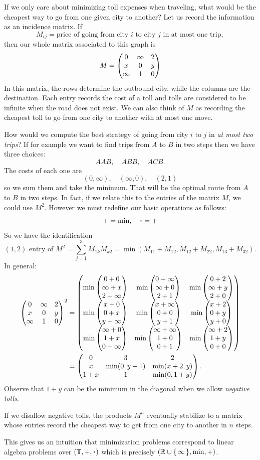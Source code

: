 \documentclass[12pt]{memoir}
\begin{document}
If we only care about minimizing toll expenses when traveling, what would be the cheapest way to go from one given city to another? Let us record the information as an incidence matrix. If 
$$M_{ij}=\text{price of going from city }i\text{ to city }j\text{ in at most one trip},$$
then our whole matrix associated to this graph is 
$$M=\begin{pmatrix} 0 & \infty & 2 \\ x & 0 & y \\ \infty & 1 & 0 \end{pmatrix}$$
In this matrix, the rows determine the outbound city, while the columns are the destination. Each entry records the cost of a toll and tolls are considered to be infinite when the road does not exist. We can also think of $M$ as recording the cheapest toll to go from one city to another with at most one move.\par 
How would we compute the best strategy of going from city $i$ to $j$ in \emph{at most two trips}? If for example we want to find trips from $A$ to $B$ in two steps then we have three choices:
$$AAB,\quad ABB,\quad ACB.$$
The costs of each one are 
$$(0,\infty),\quad (\infty,0),\quad (2,1)$$
so we sum them and take the minimum. That will be the optimal route from $A$ to $B$ in two steps. In fact, if we relate this to the entries of the matrix $M$, we could use $M^2$. However we must redefine our basic operations as follows: 
$$+=\min,\quad\.=+$$
So we have the identification 
$$(1,2)\text{ entry of }M^2=\sum_{j=1}^{3}M_{1k}M_{k2}=\min(M_{11}+M_{12},M_{12}+M_{22},M_{13}+M_{32}).$$
In general:
\begin{align*}
    \begin{pmatrix} 0 & \infty & 2 \\ x & 0 & y \\ \infty & 1 & 0 \end{pmatrix}^2&=\begin{pmatrix} \min\begin{pmatrix} 0+0 \\ \infty+x \\ 2+\infty \end{pmatrix} & \min\begin{pmatrix} 0+\infty \\ \infty+0 \\ 2+1 \end{pmatrix} & \min\begin{pmatrix} 0+2 \\ \infty+y \\ 2+0 \end{pmatrix} \\ \min\begin{pmatrix} x+0 \\ 0+x \\ y+\infty \end{pmatrix} & \min\begin{pmatrix} x+\infty \\ 0+0 \\ y+1 \end{pmatrix} & \min\begin{pmatrix} x+2 \\ 0+y \\ y+0 \end{pmatrix} \\ \min\begin{pmatrix} \infty+0 \\ 1+x \\ 0+\infty \end{pmatrix} & \min\begin{pmatrix} \infty+\infty \\ 1+0 \\ 0+1 \end{pmatrix} & \min\begin{pmatrix} \infty+2 \\ 1+y \\ 0+0 \end{pmatrix} \end{pmatrix}\\
    &=\begin{pmatrix} 0 & 3 & 2 \\ x & \min(0,y+1) & \min(x+2,y) \\ 1+x & 1 & \min(0,1+y) \end{pmatrix}.
\end{align*}
Observe that $1+y$ can be the minimum in the diagonal when we allow \emph{negative tolls}.
\begin{Rmk}
If we disallow negative tolls, the products $M^n$ eventually stabilize to a matrix whose entries record the cheapest way to get from one city to another in $n$ steps.
\end{Rmk}
This gives us an intuition that minimization problems correspond to linear algebra problems over $(\bT,+,\.)$ which is precisely $(\mathbb{R}\cup\{\,\infty\,\},\min,+)$.
\end{document}
